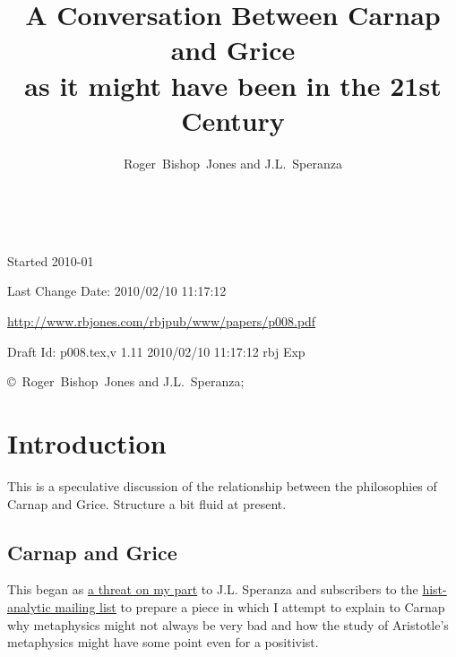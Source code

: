 \documentclass[10pt,titlepage]{book}
\title{A Conversation Between Carnap and Grice\\ {\small as it might have been in the 21st Century}}
\author{Roger~Bishop~Jones and J.L.~Speranza
}
\date{\ }
\begin{document}
\frontmatter
                               
\begin{titlepage}
\maketitle

\vfill


\vfill

\begin{centering}

\vfill

\footnotesize{
Started 2010-01

Last Change $ $Date: 2010/02/10 11:17:12 $ $

\href{http://www.rbjones.com/rbjpub/www/papers/p008.pdf}{http://www.rbjones.com/rbjpub/www/papers/p008.pdf}

Draft $ $Id: p008.tex,v 1.11 2010/02/10 11:17:12 rbj Exp $ $

\copyright\ Roger~Bishop~Jones and J.L.~Speranza;

}%
\end{centering}

\end{titlepage}

\setcounter{tocdepth}{3}
{\parskip-0pt\tableofcontents}

\mainmatter

\chapter{Introduction}

This is a speculative discussion of the relationship between the philosophies of Carnap and Grice.
Structure a bit fluid at present.

\section{Carnap and Grice}\label{CARNAPANDGRICE}

This began as \href{http://rbjones.com/pipermail/hist-analytic_rbjones.com/2009q2/000267.html}{a threat on my part} to J.L. Speranza and subscribers to the \href{http://www.hist-analytic.org/}{hist-analytic mailing list} to prepare a piece in which I attempt to explain to Carnap why metaphysics might not always be very bad and how the study of Aristotle's metaphysics might have some point even for a positivist.
\end{document}
